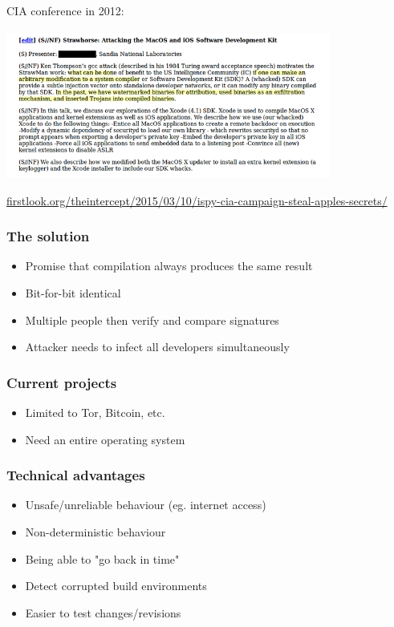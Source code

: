 \documentclass[14pt,aspectratio=169]{beamer}
\begin{document}
\begin{frame}[fragile]
 CIA conference in 2012:
 \begin{center}
  \includegraphics[width=0.8\textwidth]{images/strawhorse.png}

  {\footnotesize
  \url{firstlook.org/theintercept/2015/03/10/ispy-cia-campaign-steal-apples-secrets/}
  }
 \end{center}
\end{frame}

\begin{frame}[fragile]
 \frametitle{The solution} \pause
 \begin{itemize}
  \item Promise that compilation always produces the same result \pause
  \item Bit-for-bit identical \pause
  \item Multiple people then verify and compare signatures \pause
  \item Attacker needs to infect all developers simultaneously 
 \end{itemize}
\end{frame}

\begin{frame}[fragile]
 \frametitle{Current projects} \pause
 \begin{itemize}
  \item Limited to Tor, Bitcoin, etc. \pause
  \item Need an entire operating system
 \end{itemize}
\end{frame}

\begin{frame}[fragile]
 \frametitle{Technical advantages} \pause
 \begin{itemize}
  \item Unsafe/unreliable behaviour (eg. internet access)
  \item Non-deterministic behaviour
  \item Being able to "go back in time"
  \item Detect corrupted build environments
  \item Easier to test changes/revisions
 \end{itemize}
\end{frame}
\end{document}
